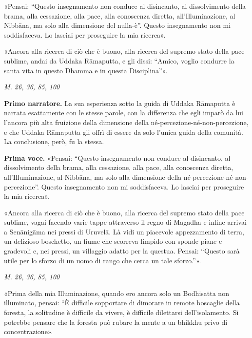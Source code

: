 «Pensai: “Questo insegnamento non conduce al disincanto, al
dissolvimento della brama, alla cessazione, alla pace, alla conoscenza
diretta, all’Illuminazione, al Nibbāna, ma solo alla dimensione del
nulla-è”. Questo insegnamento non mi soddisfaceva. Lo lasciai per
proseguire la mia ricerca».


«Ancora alla ricerca di ciò che è buono, alla ricerca del supremo stato
della pace sublime, andai da Uddaka Rāmaputta, e gli dissi: “Amico,
voglio condurre la santa vita in questo Dhamma e in questa Disciplina”».


\emph{M. 26, 36, 85, 100}


\textbf{Primo narratore.} La sua esperienza sotto la guida di Uddaka Rāmaputta è
narrata esattamente con le stesse parole, con la differenza che egli
imparò da lui l’ancora più alta fruizione della dimensione della
né-percezione-né-non-percezione, e che Uddaka Rāmaputta gli offrì di
essere da solo l’unica guida della comunità. La conclusione, però, fu la
stessa.


\textbf{Prima voce.} «Pensai: “Questo insegnamento non conduce al disincanto, al
dissolvimento della brama, alla cessazione, alla pace, alla conoscenza
diretta, all’Illuminazione, al Nibbāna, ma solo alla dimensione della
né-percezione-né-non-percezione”. Questo insegnamento non mi
soddisfaceva. Lo lasciai per proseguire la mia ricerca».


«Ancora alla ricerca di ciò che è buono, alla ricerca del supremo stato
della pace sublime, vagai facendo varie tappe attraverso il regno di
Magadha e infine arrivai a Senānigāma nei pressi di Uruvelā. Là vidi un
piacevole appezzamento di terra, un delizioso boschetto, un fiume che
scorreva limpido con sponde piane e gradevoli e, nei pressi, un
villaggio adatto per la questua. Pensai: “Questo sarà utile per lo
sforzo di un uomo di rango che cerca un tale sforzo.”».


\emph{M. 26, 36, 85, 100}


«Prima della mia Illuminazione, quando ero ancora solo un Bodhisatta non
illuminato, pensai: “È difficile sopportare di dimorare in remote
boscaglie della foresta, la solitudine è difficile da vivere, è
difficile dilettarsi dell’isolamento. Si potrebbe pensare che la foresta
può rubare la mente a un bhikkhu privo di concentrazione».


